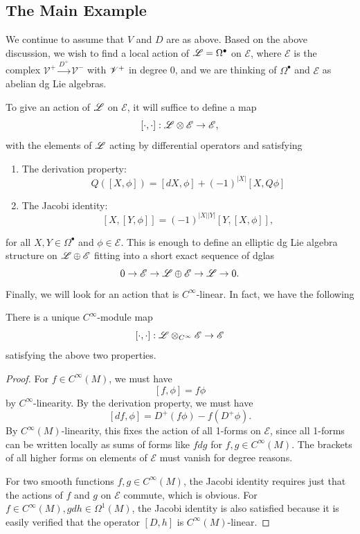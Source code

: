 \documentclass[11pt]{amsart}
\newcommand{\E}{\mscr{E}}
\newcommand{\mscr}{\mathscr}
\newcommand{\abs}[1]{\left| #1 \right|}
\numberwithin{equation}{section}
\newcommand{\cinfty}{C^{\infty}}
\begin{document}
\subsection{The Main Example}
We continue to assume that $V$ and $D$ are as above. Based on the above discussion, we wish to find a local action of $\mathscr L=\Omega^\bullet$ on $\E$, where $\E$ is the complex $\mathscr V^+ \overset{D^+}{\longrightarrow} \mathscr V^-$ with $\mathscr V^+$ in degree 0, and we are thinking of $\Omega^\bullet$ and $\E$ as abelian dg Lie algebras.

To give an action of $\mathscr L$ on $\E$, it will suffice to define a map
\[
[\cdot,\cdot]:\sL \otimes \E \to \E,
\]
with the elements of $\mathscr L$ acting by differential operators and satisfying
\begin{enumerate}
\item The derivation property:
\[
Q([X,\phi]) = [dX, \phi] +(-1)^{\abs{X}}[X,Q\phi]
\]
\item The Jacobi identity:
\[
[X,[Y,\phi]]= (-1)^{\abs{X}\abs{Y}}[Y,[X,\phi]],
\]
\end{enumerate}
for all $X,Y\in \Omega^\bullet$ and $\phi\in \E$. This is enough to define an elliptic dg Lie algebra structure on $\sL \oplus \E$ fitting into a short exact sequence of dglas
\[
0\to \E \to \sL \oplus \E \to \sL\to 0.
\]
Finally, we will look for an action that is $\cinfty$-linear. In fact, we have the following 

\begin{proposition}
\label{prop: action}
There is a unique $\cinfty$-module map
\[
[\cdot,\cdot]:\sL\otimes_{\cinfty} \E \to \E
\] 
satisfying the above two properties.
\end{proposition}
\begin{remark}

\end{remark}
\begin{proof}
For $f\in C^{\infty}(M)$, we must have 
\[
[f,\phi] = f\phi
\]
by $\cinfty$-linearity.	By the derivation property, we must have
	\[
	[df,\phi] = D^+(f\phi) - f(D^+\phi).
	\] 
	By $C^\infty(M)$-linearity, this fixes the action of all 1-forms on $\E$, since all 1-forms can be written locally as sums of forms like $fdg$ for $f,g\in C^\infty(M)$. The brackets of all higher forms on elements of $\E$ must vanish for degree reasons. 
	
For two smooth functions $f,g\in C^\infty(M)$, the Jacobi identity requires just that the actions of $f$ and $g$ on $\E$ commute, which is obvious. For $f\in C^\infty(M), gdh \in \Omega^1(M)$, the Jacobi identity is also satisfied because it is easily verified that the operator $[D,h]$ is $C^\infty(M)$-linear.
\end{proof}
\end{document}
